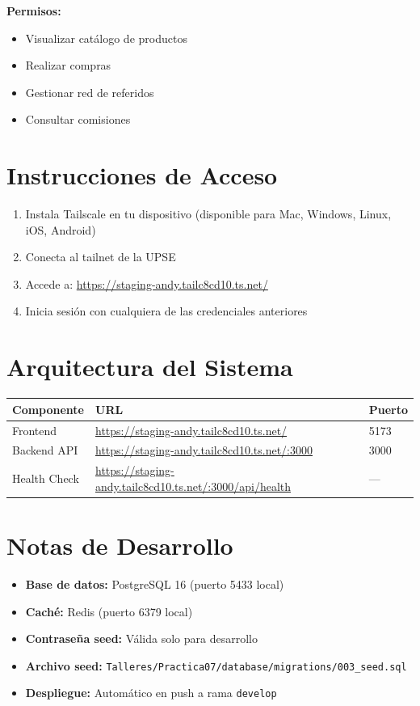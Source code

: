\documentclass[11pt]{article}
\begin{document}
\textbf{Permisos:}
\begin{itemize}
\item Visualizar catálogo de productos
\item Realizar compras
\item Gestionar red de referidos
\item Consultar comisiones
\end{itemize}

\section{Instrucciones de Acceso}

\begin{enumerate}
\item Instala Tailscale en tu dispositivo (disponible para Mac, Windows, Linux, iOS, Android)
\item Conecta al tailnet de la UPSE
\item Accede a: \url{https://staging-andy.tailc8cd10.ts.net/}
\item Inicia sesión con cualquiera de las credenciales anteriores
\end{enumerate}

\section{Arquitectura del Sistema}

\begin{table}[h]
\centering
\begin{tabular}{|l|l|l|}
\hline
\textbf{Componente} & \textbf{URL} & \textbf{Puerto} \\
\hline
Frontend & \url{https://staging-andy.tailc8cd10.ts.net/} & 5173 \\
\hline
Backend API & \url{https://staging-andy.tailc8cd10.ts.net/:3000} & 3000 \\
\hline
Health Check & \url{https://staging-andy.tailc8cd10.ts.net/:3000/api/health} & --- \\
\hline
\end{tabular}
\end{table}

\section{Notas de Desarrollo}

\begin{itemize}
\item \textbf{Base de datos:} PostgreSQL 16 (puerto 5433 local)
\item \textbf{Caché:} Redis (puerto 6379 local)
\item \textbf{Contraseña seed:} Válida solo para desarrollo
\item \textbf{Archivo seed:} \texttt{Talleres/Practica07/database/migrations/003\_seed.sql}
\item \textbf{Despliegue:} Automático en push a rama \texttt{develop}
\end{itemize}
\end{document}
